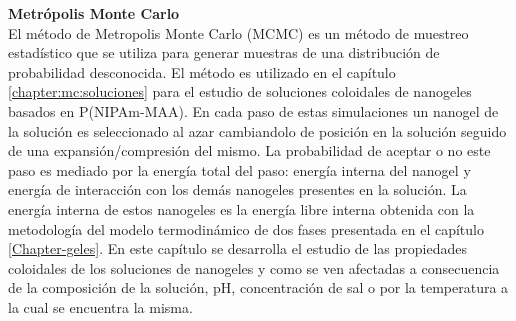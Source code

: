 

\textbf{Metr\'opolis Monte Carlo}\\
El m\'etodo de Metropolis Monte Carlo (MCMC) es un m\'etodo de muestreo estad\'istico que se utiliza para generar muestras de una distribuci\'on de probabilidad desconocida. El m\'etodo es utilizado en el cap\'itulo \ref{chapter:mc:soluciones} para el estudio de soluciones coloidales de nanogeles basados en P(NIPAm-MAA). En cada paso de estas simulaciones un nanogel de la soluci\'on es seleccionado al azar cambiandolo de posici\'on en la soluci\'on seguido de una expansi\'on/compresi\'on del mismo.
La probabilidad de aceptar o no este paso es mediado por la energ\'ia total del paso: energ\'ia interna del nanogel y energ\'ia de interacci\'on con los dem\'as nanogeles presentes en la soluci\'on. La energ\'ia interna de estos nanogeles es la energ\'ia libre interna obtenida con la metodolog\'ia del modelo termodin\'amico de dos fases presentada en el cap\'itulo \ref{Chapter-geles}. 
En este cap\'itulo se desarrolla el estudio de las propiedades coloidales de los soluciones de nanogeles y como se ven afectadas a consecuencia de la composici\'on de la soluci\'on, pH, concentraci\'on de sal o por la temperatura a la cual se encuentra la misma.
















